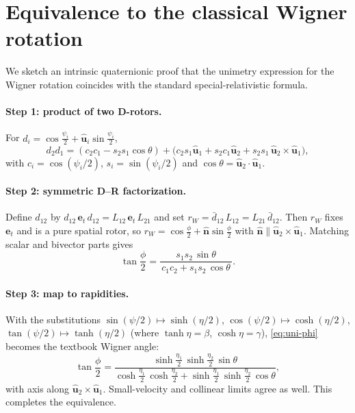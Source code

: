 \documentclass[11pt]{article}
\numberwithin{equation}{section}
\begin{document}
\appendix
\section{Equivalence to the classical Wigner rotation}
\label{app:wigner-classical}

We sketch an intrinsic quaternionic proof that the unimetry expression for the Wigner rotation
coincides with the standard special-relativistic formula.

\paragraph{Step 1: product of two D-rotors.}
For $d_i=\cos\frac{\psi_i}{2}+\hat{\mathbf u}_i\sin\frac{\psi_i}{2}$,
\begin{equation}
d_2 d_1
=(c_2c_1-s_2s_1\cos\theta)
+\Big(c_2s_1\hat{\mathbf u}_1+s_2c_1\hat{\mathbf u}_2+s_2s_1\,\hat{\mathbf u}_2\times\hat{\mathbf u}_1\Big),
\end{equation}
with $c_i=\cos(\psi_i/2)$, $s_i=\sin(\psi_i/2)$ and $\cos\theta=\hat{\mathbf u}_2\!\cdot\!\hat{\mathbf u}_1$.

\paragraph{Step 2: symmetric D--R factorization.}
Define $d_{12}$ by $d_{12}\,\mathbf e_t\, d_{12}=L_{12}\,\mathbf e_t\, L_{21}$ and set
$r_W=\bar d_{12}\,L_{12}=L_{21}\,\bar d_{12}$. Then $r_W$ fixes $\mathbf e_t$ and is a pure spatial
rotor, so $r_W=\cos\frac{\phi}{2}+\hat{\mathbf n}\sin\frac{\phi}{2}$ with
$\hat{\mathbf n}\parallel \hat{\mathbf u}_2\times\hat{\mathbf u}_1$. Matching scalar and bivector parts gives
\begin{equation}
\tan\frac{\phi}{2}=
\frac{s_1 s_2\,\sin\theta}{\,c_1 c_2+s_1 s_2\,\cos\theta\,}.
\label{eq:uni-phi}
\end{equation}

\paragraph{Step 3: map to rapidities.}
With the substitutions $\sin(\psi/2)\mapsto\sinh(\eta/2)$, $\cos(\psi/2)\mapsto\cosh(\eta/2)$,
$\tan(\psi/2)\mapsto\tanh(\eta/2)$ (where $\tanh\eta=\beta$, $\cosh\eta=\gamma$), \eqref{eq:uni-phi}
becomes the textbook Wigner angle:
\begin{equation}
\tan\frac{\phi}{2}
=\frac{\sinh\frac{\eta_1}{2}\,\sinh\frac{\eta_2}{2}\,\sin\theta}
{\cosh\frac{\eta_1}{2}\,\cosh\frac{\eta_2}{2}+\sinh\frac{\eta_1}{2}\,\sinh\frac{\eta_2}{2}\,\cos\theta},
\end{equation}
with axis along $\hat{\mathbf u}_2\times\hat{\mathbf u}_1$. Small-velocity and collinear limits agree as well.
This completes the equivalence.
\end{document}
